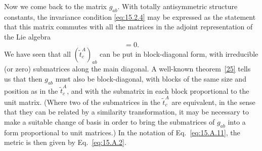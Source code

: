 Now we come back to the matrix $g_{ab}$. With totally antisymmetric structure constants, the invariance condition \eqref{eq:15.2.4} may be expressed as the statement that this matrix commutes with all the matrices in the adjoint representation of the Lie algebra
\begin{equation}
 [g,\widetilde t^A_c]=0.
 \tag{15.A.14}\label{eq:15.A.14}
\end{equation}
We have seen that all $(\widetilde t^A_c)_{ab}$ can be put in block-diagonal form, with irreducible (or zero) submatrices along the main diagonal. A well-known theorem~\hyperref[ch15-ref-25]{[25]} tells us that then $g_{ab}$ must also be block-diagonal, with blocks of the same size and position as in the $\widetilde t^A_c$, and with the submatrix in each block proportional to the unit matrix. (Where two of the submatrices in the $\widetilde t^A_c$ are equivalent, in the sense that they can be related by a similarity transformation, it may be necessary to make a suitable change of basis in order to bring the submatrices of $g_{ab}$ into a form proportional to unit matrices.) In the notation of Eq.~\eqref{eq:15.A.11}, the metric is then given by Eq.~\eqref{eq:15.A.2}.
